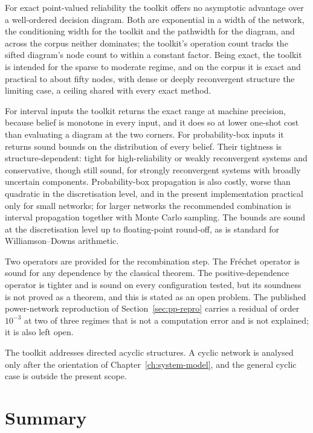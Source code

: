 \documentclass[12pt]{report}
\begin{document}
For exact point-valued reliability the toolkit offers no asymptotic advantage over a
well-ordered decision diagram. Both are exponential in a width of the network, the
conditioning width for the toolkit and the pathwidth for the diagram, and across the corpus
neither dominates; the toolkit's operation count tracks the sifted diagram's node count to
within a constant factor. Being exact, the toolkit is intended for the sparse to moderate
regime, and on the corpus it is exact and practical to about fifty nodes, with dense or
deeply reconvergent structure the limiting case, a ceiling shared with every exact method.

For interval inputs the toolkit returns the exact range at machine precision, because
belief is monotone in every input, and it does so at lower one-shot cost than evaluating a
diagram at the two corners. For probability-box inputs it returns sound bounds on the
distribution of every belief. Their tightness is structure-dependent: tight for
high-reliability or weakly reconvergent systems and conservative, though still sound, for
strongly reconvergent systems with broadly uncertain components. Probability-box propagation
is also costly, worse than quadratic in the discretisation level, and in the present
implementation practical only for small networks; for larger networks the recommended
combination is interval propagation together with Monte Carlo sampling. The bounds are sound
at the discretisation level up to floating-point round-off, as is standard for
Williamson--Downs arithmetic.

Two operators are provided for the recombination step. The Fr\'{e}chet operator is sound for
any dependence by the classical theorem. The positive-dependence operator is tighter and is
sound on every configuration tested, but its soundness is not proved as a theorem, and this
is stated as an open problem. The published power-network reproduction of
Section~\ref{sec:pp-repro} carries a residual of order $10^{-3}$ at two of three regimes
that is not a computation error and is not explained; it is also left open.

The toolkit addresses directed acyclic structures. A cyclic network is analysed only after
the orientation of Chapter~\ref{ch:system-model}, and the general cyclic case is outside the
present scope.

\section{Summary}
\label{sec:pp-summary}
\end{document}
